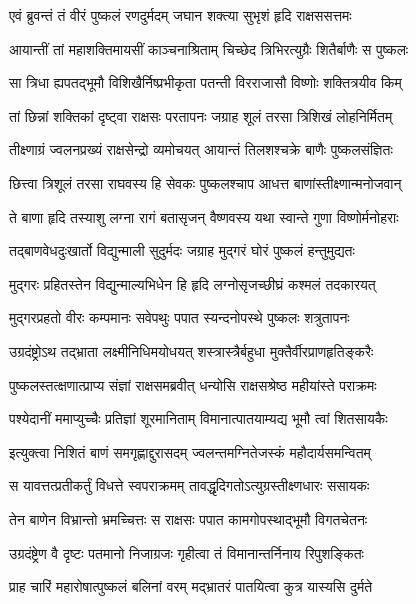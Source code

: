 \twolineshloka
{एवं ब्रुवन्तं तं वीरं पुष्कलं रणदुर्मदम्}
{जघान शक्त्या सुभृशं हृदि राक्षससत्तमः}%

\twolineshloka
{आयान्तीं तां महाशक्तिमायसीं काञ्चनाश्रिताम्}
{चिच्छेद त्रिभिरत्युग्रैः शितैर्बाणैः स पुष्कलः}%

\twolineshloka
{सा त्रिधा ह्यपतद्भूमौ विशिखैर्निष्प्रभीकृता}
{पतन्ती विरराजासौ विष्णोः शक्तित्रयीव किम्}%

\twolineshloka
{तां छिन्नां शक्तिकां दृष्ट्वा राक्षसः परतापनः}
{जग्राह शूलं तरसा त्रिशिखं लोहनिर्मितम्}%

\twolineshloka
{तीक्ष्णाग्रं ज्वलनप्रख्यं राक्षसेन्द्रो व्यमोचयत्}
{आयान्तं तिलशश्चक्रे बाणैः पुष्कलसंज्ञितः}%

\twolineshloka
{छित्त्वा त्रिशूलं तरसा राघवस्य हि सेवकः}
{पुष्कलश्चाप आधत्त बाणांस्तीक्ष्णान्मनोजवान्}%

\twolineshloka
{ते बाणा हृदि तस्याशु लग्ना रागं बतासृजन्}
{वैष्णवस्य यथा स्वान्ते गुणा विष्णोर्मनोहराः}%

\twolineshloka
{तद्बाणवेधदुःखार्तो विद्युन्माली सुदुर्मदः}
{जग्राह मुद्गरं घोरं पुष्कलं हन्तुमुद्यतः}%

\twolineshloka
{मुद्गरः प्रहितस्तेन विद्युन्माल्यभिधेन हि}
{हृदि लग्नोसृजच्छीघ्रं कश्मलं तदकारयत्}%

\twolineshloka
{मुद्गरप्रहतो वीरः कम्पमानः सवेपथुः}
{पपात स्यन्दनोपस्थे पुष्कलः शत्रुतापनः}%

\twolineshloka
{उग्रदंष्ट्रोऽथ तद्भ्राता लक्ष्मीनिधिमयोधयत्}
{शस्त्रास्त्रैर्बहुधा मुक्तैर्वीरप्राणहृतिङ्करैः}%

\twolineshloka
{पुष्कलस्तत्क्षणात्प्राप्य संज्ञां राक्षसमब्रवीत्}
{धन्योसि राक्षसश्रेष्ठ महीयांस्ते पराक्रमः}%

\twolineshloka
{पश्येदानीं ममाप्युच्चैः प्रतिज्ञां शूरमानिताम्}
{विमानात्पातयाम्यद्य भूमौ त्वां शितसायकैः}%

\twolineshloka
{इत्युक्त्वा निशितं बाणं समगृह्णाद्दुरासदम्}
{ज्वलन्तमग्नितेजस्कं महौदार्यसमन्वितम्}%

\twolineshloka
{स यावत्तत्प्रतीकर्तुं विधत्ते स्वपराक्रमम्}
{तावद्धृदिगतोऽत्युग्रस्तीक्ष्णधारः ससायकः}%

\twolineshloka
{तेन बाणेन विभ्रान्तो भ्रमच्चित्तः स राक्षसः}
{पपात कामगोपस्थाद्भूमौ विगतचेतनः}%

\twolineshloka
{उग्रदंष्ट्रेण वै दृष्टः पतमानो निजाग्रजः}
{गृहीत्वा तं विमानान्तर्निनाय रिपुशङ्कितः}%

\twolineshloka
{प्राह चारिं महारोषात्पुष्कलं बलिनां वरम्}
{मद्भ्रातरं पातयित्वा कुत्र यास्यसि दुर्मते}%

